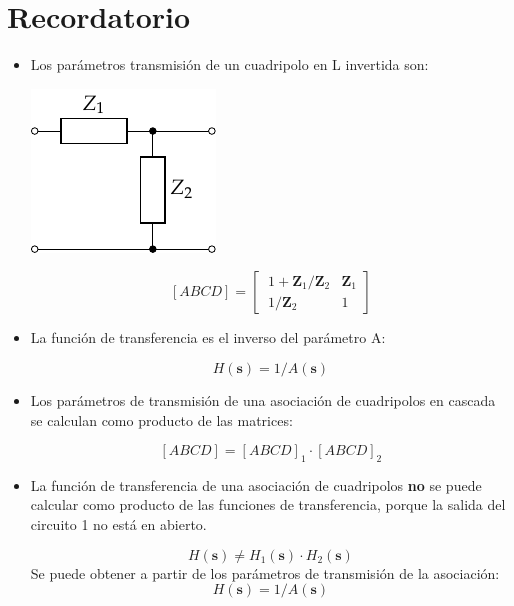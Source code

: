 \documentclass[a4paper,10pt]{article} %
\begin{document}
\section*{Recordatorio}
\begin{itemize}
\item Los parámetros transmisión de un cuadripolo en L invertida son:

  
  \begin{minipage}{0.5\linewidth}
    \begin{center}
      \includegraphics[height=0.1\textheight]{../figs/circuito_P6_impedancia}
    \end{center}
  \end{minipage}
  \begin{minipage}{0.5\linewidth}
    \[
      [ABCD] = \left[
        \
        \begin{array}{cc}
          1 + \mathbf{Z}_1/\mathbf{Z}_2 & \mathbf{Z}_1\\
          1/\mathbf{Z}_2 & 1
        \end{array}
      \right]
    \]
  \end{minipage}

\item La función de transferencia es el inverso del parámetro A:

  \[
    H(\mathbf{s}) = 1/A(\mathbf{s})
  \]

\item Los parámetros de transmisión de una asociación de cuadripolos en cascada se calculan como producto de las matrices:

  \[
    [ABCD] = [ABCD]_1 \cdot [ABCD]_2
  \]

\item   La función de transferencia de una asociación de cuadripolos \textbf{no} se puede calcular como producto de las funciones de transferencia, porque la salida del circuito 1 no está en abierto.

  \[
    H(\mathbf{s}) \neq H_1(\mathbf{s}) \cdot H_2(\mathbf{s})
  \]
  Se puede obtener a partir de los parámetros de transmisión de la asociación:
  \[
    H(\mathbf{s}) = 1/A(\mathbf{s})
  \]

\end{itemize}
\end{document}
